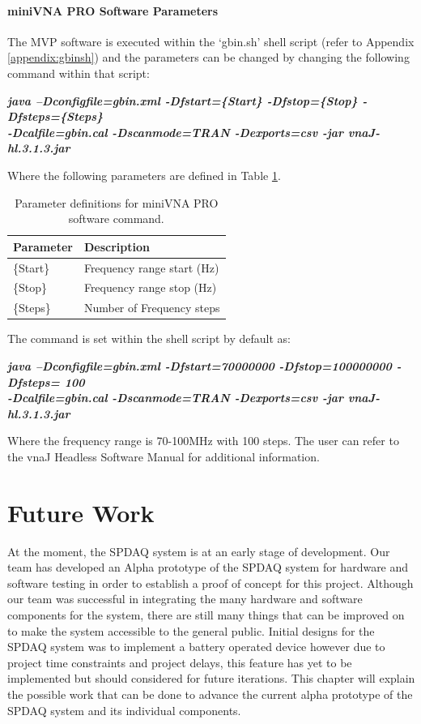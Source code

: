 \subsubsection{miniVNA PRO Software Parameters}

The MVP software is executed within the ‘gbin.sh’ shell script (refer to Appendix  \ref{appendix:gbinsh}) and the parameters can be changed by
changing the following command within that script:

\noindent
\textbf{\textit{java –Dconfigfile=gbin.xml -Dfstart=\{Start\} -Dfstop=\{Stop\} -Dfsteps=\{Steps\} 
\\-Dcalfile=gbin.cal -Dscanmode=TRAN -Dexports=csv -jar vnaJ-hl.3.1.3.jar}}

Where the following parameters are defined in Table \ref{table:vnaj}.

\begin{table}[h]
\centering
\caption{Parameter definitions for miniVNA PRO software command.}
\label{table:vnaj}
\begin{tabular}{|l|l|}
\hline
\textbf{Parameter} 	& \textbf{Description} 			\\ \hline
\{Start\}          	& Frequency range start (Hz) 	\\ \hline
\{Stop\}           	& Frequency range stop (Hz)		\\ \hline
\{Steps\} 			& Number of Frequency steps	\\ \hline
\end{tabular}
\end{table}

\noindent
The command is set within the shell script by default as:

\noindent
\textbf{\textit{java –Dconfigfile=gbin.xml -Dfstart=70000000 -Dfstop=100000000 -Dfsteps= 100
\\-Dcalfile=gbin.cal -Dscanmode=TRAN -Dexports=csv -jar vnaJ-hl.3.1.3.jar }}

\noindent
Where the frequency range is 70-100MHz with 100 steps.  The user can refer to the vnaJ Headless Software Manual
\cite{vnaJ-hl} for additional information.

\chapter{Future Work}

At the moment, the SPDAQ system is at an early stage of development. Our team has developed an Alpha prototype of the SPDAQ
system for hardware and software testing in order to establish a proof of concept for this project. Although our team was
successful in integrating the many hardware and software components for the system, there are still many things that can be improved on to make the system accessible to the general public. Initial designs for the SPDAQ system was to implement a battery operated device however due to project time constraints and project delays, this feature has yet to be implemented but should considered for future iterations. This chapter will explain the possible work that can be
done to advance the current alpha prototype of the SPDAQ system and its individual components.

